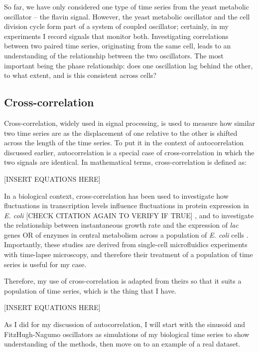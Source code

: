 So far, we have only considered one type of time series from the yeast metabolic oscillator -- the flavin signal.
However, the yeast metabolic oscillator and the cell division cycle form part of a system of coupled oscillator; certainly, in my experiments I record signals that monitor both.
Investigating correlations between two paired time series, originating from the same cell, leads to an understanding of the relationship between the two oscillators.
The most important being the phase relationship: does one oscillation lag behind the other, to what extent, and is this consistent across cells?

\subsection{Cross-correlation}
\label{sec:analysis-correlation-xcf}

Cross-correlation, widely used in signal processing, is used to measure how similar two time series are as the displacement of one relative to the other is shifted across the length of the time series.
To put it in the context of autocorrelation discussed earlier, autocorrelation is a special case of cross-correlation in which the two signals are identical.
In mathematical terms, cross-correlation is defined as:

[INSERT EQUATIONS HERE]

In a biological context, cross-correlation has been used to investigate how fluctuations in transcription levels influence fluctuations in protein expression in \textit{E. coli} [CHECK CITATION AGAIN TO VERIFY IF TRUE] \parencite{dunlopRegulatoryActivityRevealed2008},
and to investigate the relationship between instantaneous growth rate and the expression of \textit{lac} genes OR of enzymes in central metabolism across a population of \textit{E. coli} cells \parencite{kivietStochasticityMetabolismGrowth2014}.
Importantly, these studies are derived from single-cell microfluidics experiments with time-lapse microscopy, and therefore their treatment of a population of time series is useful for my case.

Therefore, my use of cross-correlation is adapted from theirs so that it suits a population of time series, which is the thing that I have.

[INSERT EQUATIONS HERE]

As I did for my discussion of autocorrelation, I will start with the sinusoid and FitzHugh-Nagumo oscillators as simulations of my biological time series to show understanding of the methods,
then move on to an example of a real dataset.

